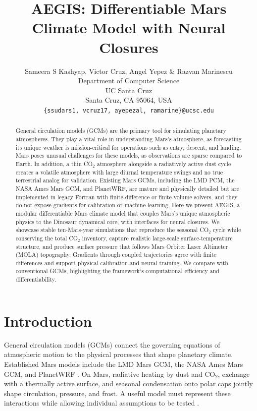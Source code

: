 \documentclass{article} %
\title{AEGIS: Differentiable Mars Climate Model with Neural Closures}
\author{Sameera S Kashyap, Victor Cruz, Angel Yepez  \& Razvan Marinescu \\
Department of Computer Science\\
UC Santa Cruz\\
Santa Cruz, CA 95064, USA \\
\texttt{\{ssudars1, vcruz17, ayepezal, ramarine\}@ucsc.edu} \\
}
\newcommand{\co}{CO$_2$}
\begin{document}
\maketitle
\begin{abstract}                                                      
General circulation models (GCMs) are the primary tool for simulating planetary atmospheres. They play a vital role in understanding Mars's atmosphere, as forecasting its unique weather is mission-critical for operations such as entry, descent, and landing. Mars poses unusual challenges for these models, as observations are sparse compared to Earth.  In addition, a thin \co{} atmosphere alongside a radiatively active dust cycle creates a volatile atmosphere with large diurnal temperature swings and no true terrestrial analog for validation. Existing Mars GCMs, including the LMD PCM, the NASA Ames Mars GCM, and PlanetWRF, are mature and physically detailed but are implemented in legacy Fortran with finite-difference or finite-volume solvers, and they do not expose gradients for calibration or machine learning. Here we present AEGIS, a modular differentiable Mars climate model that couples Mars's unique atmospheric physics to the Dinosaur dynamical core, with interfaces for neural closures. We showcase stable ten-Mars-year simulations that reproduce the seasonal \co{} cycle while conserving the total \co{} inventory, capture realistic large-scale surface-temperature structure, and produce surface pressure that follows Mars Orbiter Laser Altimeter (MOLA) topography. Gradients through coupled trajectories agree with finite differences and support physical calibration and neural training. We compare with conventional GCMs, highlighting the framework's computational efficiency and differentiability.
\end{abstract}

\section{Introduction}
General circulation models (GCMs) connect the governing equations of atmospheric motion to the physical processes that shape planetary climate. Established Mars models include the LMD Mars GCM, the NASA Ames Mars GCM, and PlanetWRF \citep{forget1999,haberle1993,richardson2007}. On Mars, radiative heating by dust and \co{}, exchange with a thermally active surface, and seasonal condensation onto polar caps jointly shape circulation, pressure, and frost. A useful model must represent these interactions while allowing individual assumptions to be tested \citep{forget2010co2cycle}.
\end{document}
